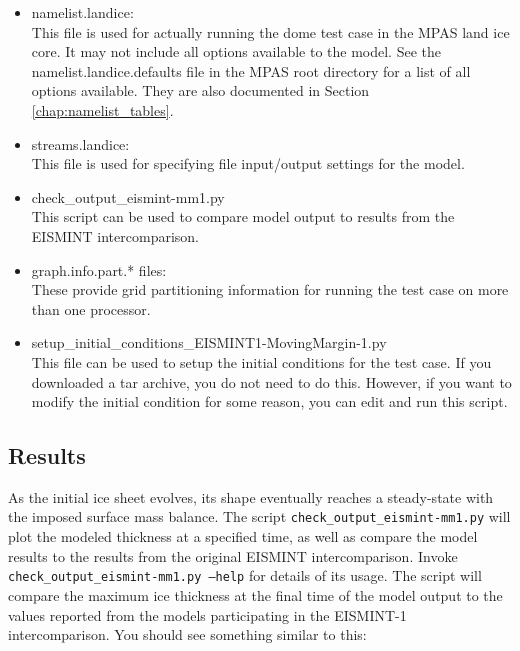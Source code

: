 \begin{itemize}
\item namelist.landice: \\
	This file is used for actually running the dome test case in the MPAS land ice core.  It may not include all options available to the model.  See the namelist.landice.defaults file in the MPAS root directory for a list of all options available.  They are also documented in Section \ref{chap:namelist_tables}.

\item streams.landice: \\
	This file is used for specifying file input/output settings for the model.

\item check\_output\_eismint-mm1.py \\
This script can be used to compare model output to results from the EISMINT intercomparison.


\item graph.info.part.* files: \\ 
		These provide grid partitioning information for running the test case on more than one processor.  

\item setup\_initial\_conditions\_EISMINT1-MovingMargin-1.py \\
This file can be used to setup the initial conditions for the test case.  If you downloaded a tar archive, you do not need to do this.  However, if you want to modify the initial condition for some reason, you can edit and run this script.

\end{itemize}

\subsection{Results}
\label{subsecc:eismint_results}
As the initial ice sheet evolves, its shape eventually reaches a steady-state with the imposed surface mass balance.  
The script \texttt{check\_output\_eismint-mm1.py} will plot the modeled thickness at a specified time, 
as well as compare the model results to the results from the original EISMINT intercomparison.  
Invoke \texttt{check\_output\_eismint-mm1.py --help} for details of its usage.  
The script will compare the maximum ice thickness at the final time of the model output 
to the values reported from the models participating in the EISMINT-1 intercomparison.  
You should see something similar to this:

